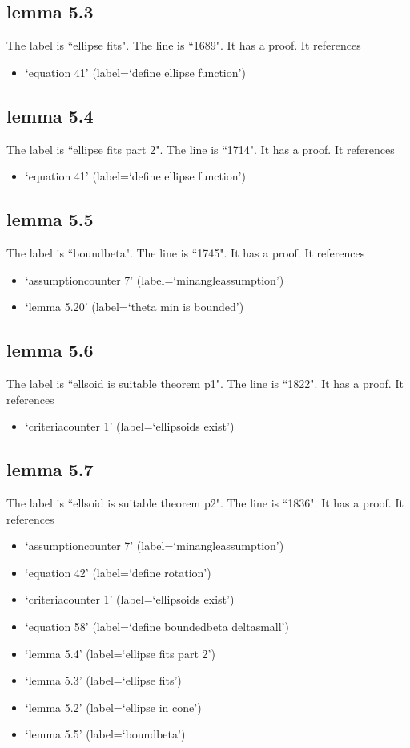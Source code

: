 \documentclass{article}
\begin{document}
\subsection{lemma 5.3}
The label is ``ellipse fits".
The line is ``1689".
It has a proof.
It references \begin{itemize}
\item `equation 41' (label=`define ellipse function')
\end{itemize}
\subsection{lemma 5.4}
The label is ``ellipse fits part 2".
The line is ``1714".
It has a proof.
It references \begin{itemize}
\item `equation 41' (label=`define ellipse function')
\end{itemize}
\subsection{lemma 5.5}
The label is ``boundbeta".
The line is ``1745".
It has a proof.
It references \begin{itemize}
\item `assumptioncounter 7' (label=`minangleassumption')
\item `lemma 5.20' (label=`theta min is bounded')
\end{itemize}
\subsection{lemma 5.6}
The label is ``ellsoid is suitable theorem p1".
The line is ``1822".
It has a proof.
It references \begin{itemize}
\item `criteriacounter 1' (label=`ellipsoids exist')
\end{itemize}
\subsection{lemma 5.7}
The label is ``ellsoid is suitable theorem p2".
The line is ``1836".
It has a proof.
It references \begin{itemize}
\item `assumptioncounter 7' (label=`minangleassumption')
\item `equation 42' (label=`define rotation')
\item `criteriacounter 1' (label=`ellipsoids exist')
\item `equation 58' (label=`define boundedbeta deltasmall')
\item `lemma 5.4' (label=`ellipse fits part 2')
\item `lemma 5.3' (label=`ellipse fits')
\item `lemma 5.2' (label=`ellipse in cone')
\item `lemma 5.5' (label=`boundbeta')
\end{itemize}
\end{document}
